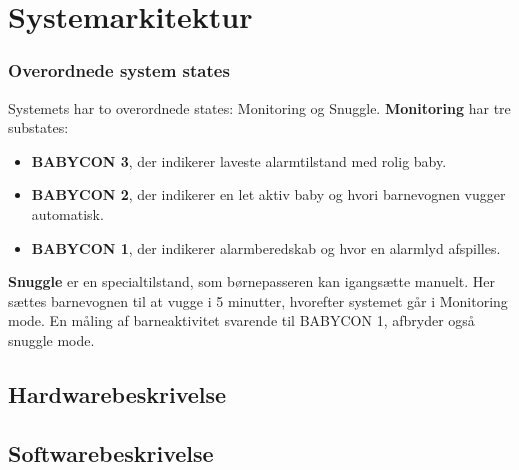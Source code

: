 \chapter{Systemarkitektur}



\subsection{Overordnede system states}

Systemets har to overordnede states: Monitoring og Snuggle. \textbf{Monitoring} har tre substates: 
\begin{itemize}
\item \textbf{BABYCON 3}, der indikerer laveste alarmtilstand med rolig baby. \item \textbf{BABYCON 2}, der indikerer en let aktiv baby og hvori barnevognen vugger automatisk.
\item \textbf{BABYCON 1}, der indikerer alarmberedskab og hvor en alarmlyd afspilles. 
\end{itemize}

\textbf{Snuggle} er en specialtilstand, som børnepasseren kan igangsætte manuelt. Her sættes barnevognen til at vugge i 5 minutter, hvorefter systemet går i Monitoring mode. En måling af barneaktivitet svarende til BABYCON 1, afbryder også snuggle mode.


\newpage
\section{Hardwarebeskrivelse}


\clearpage
\section{Softwarebeskrivelse}



